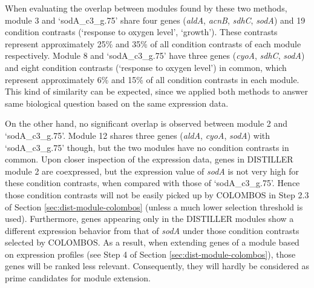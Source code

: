 When evaluating the overlap between modules found by
these two methods, module 3 and `sodA\_c3\_g.75' share four genes 
(\textit{aldA}, \textit{acnB}, \textit{sdhC}, \textit{sodA}) and 19 condition 
contrasts (`response to oxygen level', `growth').  
These contrasts represent approximately 25\% and 35\%
of all condition contrasts of each module respectively. Module 8 and
`sodA\_c3\_g.75' have three genes (\textit{cyoA}, \textit{sdhC}, \textit{sodA}) 
and eight condition contrasts (`response to oxygen level') in common, which 
represent approximately 6\% and 15\% of all condition contrasts in each module. 
This kind of similarity can be expected, since we applied both methods to
answer same biological question based on the same expression data.

On the other hand, no significant overlap is observed between module 2
and `sodA\_c3\_g.75'. Module 12 shares three genes (\textit{aldA}, 
\textit{cyoA}, \textit{sodA}) with `sodA\_c3\_g.75' though, but the two modules 
have no condition contrasts in common. 
Upon closer inspection of the expression data, genes in
DISTILLER module 2 are coexpressed, but the expression value of \textit{sodA} is
not very high for these condition contrasts, when compared with those of
`sodA\_c3\_g.75'. Hence those condition contrasts will not be easily
picked up by COLOMBOS in Step 2.3 of Section \ref{sec:dist-module-colombos} 
(unless a much lower selection threshold is used). 
Furthermore, genes appearing only in the DISTILLER modules show a different 
expression behavior from that of \textit{sodA} under those condition contrasts 
selected by COLOMBOS. 
As a result, when extending genes of a module based on expression profiles (see 
Step 4 of Section \ref{sec:dist-module-colombos}), those genes will be ranked 
less relevant. Consequently, they will hardly be considered as prime candidates 
for module extension.

